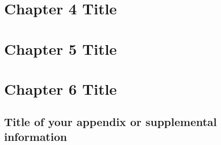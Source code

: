 \documentclass[12pt]{report}
\begin{document}
\begin{justify}
\chapter{Chapter 4 Title}


\chapter{Chapter 5 Title}


\chapter{Chapter 6 Title}


\begin{spacing}{1.0}
    \printbibliography
\end{spacing}

\begin{appendices}
    \chapter{Title of your appendix or supplemental information}
        \label{appendix:short_name_for_ref_command}
        
%       
%       
\end{appendices}

\end{justify}
\end{document}
